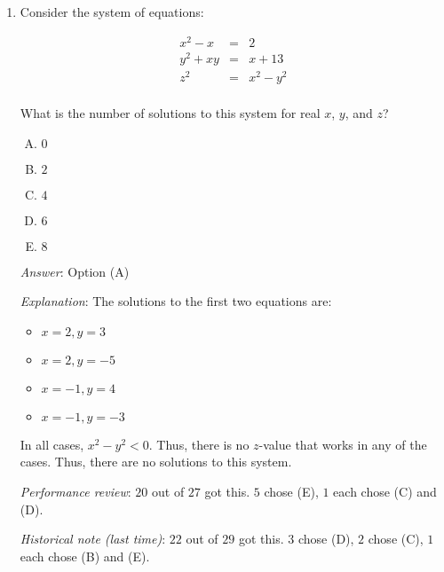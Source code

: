 \documentclass[10pt]{amsart}
\begin{document}
\begin{enumerate}
  Of the four possible $(x,y)$-value pairs, only two give positive
  products. The other two give negative products. In both the positive
  product cases, we get $2$ values of $z$, so we overall get four
  solutions as listed below:

  \begin{itemize}
  \item $x = 2, y = 3, z = \sqrt{6}$
  \item $x = 2, y = 3, z = -\sqrt{6}$
  \item $x = -1, y = -3, z = \sqrt{3}$
  \item $x = -1, y = -3, z = -\sqrt{3}$
  \end{itemize}

  {\em Performance review}: $11$ out of $27$ got this. $10$ chose (B),
  $3$ chose (D), $2$ chose (E), $1$ chose (A).

  {\em Historical note (last time)}: $25$ out of $29$ got this. $2$ chose (D),
  $1$ each chose (B) and (E).
\item Consider the system of equations:

  \begin{eqnarray*}
    x^2 - x & = & 2 \\
    y^2 + xy & = & x + 13 \\
    z^2 & = & x^2 - y^2 \\
  \end{eqnarray*}

  What is the number of solutions to this system for real $x$, $y$,
  and $z$?

  \begin{enumerate}[(A)]
  \item $0$
  \item $2$
  \item $4$
  \item $6$
  \item $8$
  \end{enumerate}

  {\em Answer}: Option (A)

  {\em Explanation}: The solutions to the first two equations are:

  \begin{itemize}
  \item $x = 2, y = 3$
  \item $x = 2, y = -5$
  \item $x = -1, y = 4$
  \item $x = -1, y = -3$
  \end{itemize}

  In all cases, $x^2 - y^2 < 0$. Thus, there is no $z$-value that
  works in any of the cases. Thus, there are no solutions to this
  system.

  {\em Performance review}: $20$ out of $27$ got this. $5$ chose (E),
  $1$ each chose (C) and (D).

  {\em Historical note (last time)}: $22$ out of $29$ got this. $3$ chose (D),
  $2$ chose (C), $1$ each chose (B) and (E).
\end{enumerate}
\end{document}
